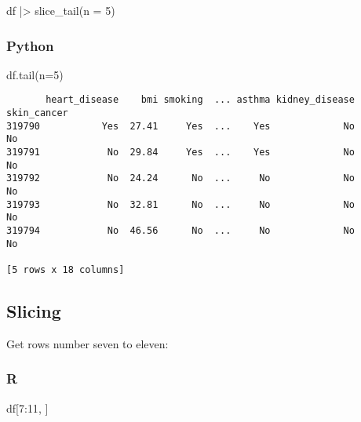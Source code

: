 \documentclass[
  letterpaper,
  DIV=11,
  numbers=noendperiod]{scrreprt}
\newenvironment{Shaded}{\begin{snugshade}}{\end{snugshade}}
\newcommand{\AttributeTok}[1]{\textcolor[rgb]{0.40,0.46,0.14}{#1}}
\newcommand{\DecValTok}[1]{\textcolor[rgb]{0.68,0.00,0.00}{#1}}
\newcommand{\FunctionTok}[1]{\textcolor[rgb]{0.28,0.35,0.67}{#1}}
\newcommand{\NormalTok}[1]{\textcolor[rgb]{0.00,0.46,0.62}{#1}}
\newcommand{\OperatorTok}[1]{\textcolor[rgb]{0.37,0.37,0.37}{#1}}
\newcommand{\SpecialCharTok}[1]{\textcolor[rgb]{0.37,0.37,0.37}{#1}}
\begin{document}
\begin{Shaded}
\begin{Highlighting}[]
\NormalTok{df }\SpecialCharTok{|\textgreater{}} \FunctionTok{slice\_tail}\NormalTok{(}\AttributeTok{n =} \DecValTok{5}\NormalTok{)}
\end{Highlighting}
\end{Shaded}

\hypertarget{python-14}{%
\subsubsection{Python}\label{python-14}}

\begin{Shaded}
\begin{Highlighting}[]
\NormalTok{df.tail(n}\OperatorTok{=}\DecValTok{5}\NormalTok{)}
\end{Highlighting}
\end{Shaded}

\begin{verbatim}
       heart_disease    bmi smoking  ... asthma kidney_disease  skin_cancer
319790           Yes  27.41     Yes  ...    Yes             No           No
319791            No  29.84     Yes  ...    Yes             No           No
319792            No  24.24      No  ...     No             No           No
319793            No  32.81      No  ...     No             No           No
319794            No  46.56      No  ...     No             No           No

[5 rows x 18 columns]
\end{verbatim}

\hypertarget{slicing}{%
\subsection{Slicing}\label{slicing}}

Get rows number seven to eleven:

\hypertarget{r-15}{%
\subsubsection{R}\label{r-15}}

\begin{Shaded}
\begin{Highlighting}[]
\NormalTok{df[}\DecValTok{7}\SpecialCharTok{:}\DecValTok{11}\NormalTok{, ]}
\end{Highlighting}
\end{Shaded}
\end{document}
